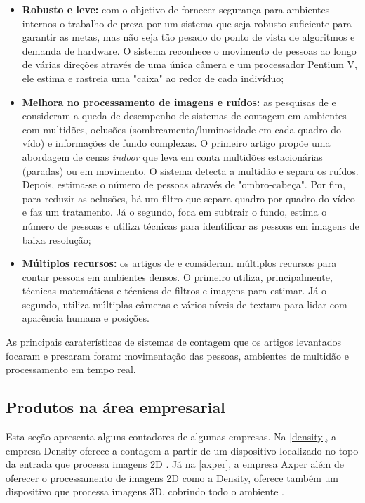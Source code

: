 \begin{itemize}
  \item \textbf{Robusto e leve:} com o objetivo de fornecer segurança para ambientes internos
  o trabalho de  preza por um sistema que seja robusto suficiente para garantir as metas, mas
  não seja tão pesado do ponto de vista de algoritmos e demanda de hardware. O sistema reconhece o movimento de pessoas
  ao longo de várias direções através de uma única câmera e um processador Pentium V, ele estima e rastreia uma "caixa" ao redor de cada indivíduo;
  \item \textbf{Melhora no processamento de imagens e ruídos:} as pesquisas de  e  consideram
  a queda de desempenho de sistemas de contagem em ambientes com multidões, oclusões (sombreamento/luminosidade
  em cada quadro do vído) e informações de fundo complexas. O primeiro artigo propõe uma abordagem de cenas \emph{indoor}
  que leva em conta multidões estacionárias (paradas) ou em movimento. O sistema detecta a multidão e separa
  os ruídos. Depois, estima-se o número de pessoas através de "ombro-cabeça". Por fim, para reduzir as oclusões,
  há um filtro que separa quadro por quadro do vídeo e faz um tratamento. Já o segundo, foca em subtrair o fundo, estima
  o número de pessoas e utiliza técnicas para identificar as pessoas em imagens de baixa resolução;
  \item \textbf{Múltiplos recursos:} os artigos de  e  consideram múltiplos recursos para contar pessoas
  em ambientes densos. O primeiro utiliza, principalmente, técnicas matemáticas e técnicas de filtros e imagens para estimar. Já o segundo, utiliza
  múltiplas câmeras e vários níveis de textura para lidar com aparência humana e posições.

\end{itemize}

  As principais caraterísticas de sistemas de contagem que os artigos levantados focaram e presaram foram: movimentação das pessoas,
  ambientes de multidão e processamento em tempo real.

\subsection{Produtos na área empresarial}
\label{produtos-empresas}
Esta seção apresenta alguns contadores de algumas empresas. Na \autoref{density}, a empresa Density oferece a contagem a partir de um
dispositivo localizado no topo da entrada que processa imagens 2D \cite{Density2017}. Já na \autoref{axper}, a empresa Axper além de oferecer
o processamento de imagens 2D como a Density, oferece também um dispositivo que processa imagens 3D, cobrindo todo o ambiente \cite{Axper2017}.

